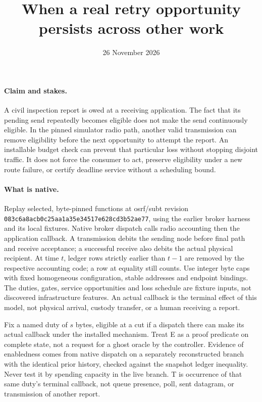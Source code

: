\documentclass{article}
\title{When a real retry opportunity persists across other work}
\date{26 November 2026}
\begin{document}
\maketitle
\paragraph{Claim and stakes.}
A civil inspection report is owed at a receiving application. The
fact that its pending send repeatedly becomes eligible does not make
the send continuously eligible. In the pinned simulator radio path,
another valid transmission can remove eligibility before the next
opportunity to attempt the report. An installable budget check can
prevent that particular loss without stopping disjoint traffic. It
does not force the consumer to act, preserve eligibility under a new
route failure, or certify deadline service without a scheduling bound.

\paragraph{What is native.}
Replay selected, byte-pinned functions at osrf/subt revision
\texttt{083c6a8acb0c25aa1a35e34517e628cd3b52ae77}, using the earlier
broker harness and its local fixtures. Native broker dispatch calls
radio accounting then the application callback. A transmission debits
the sending node before final path and receive acceptance; a successful
receive also debits the actual physical recipient. At time \(t\), ledger
rows strictly earlier than \(t-1\) are removed by the respective
accounting code; a row at equality still counts. Use integer byte
caps with fixed homogeneous configuration, stable addresses and
endpoint bindings. The duties, gates, service opportunities and
loss schedule are fixture inputs, not discovered infrastructure
features. An actual callback is the terminal effect of this model,
not physical arrival, custody transfer, or a human receiving a report.

Fix a named duty of \(s\) bytes, eligible at a cut if a dispatch there
can make its actual callback under the installed mechanism. Treat E
as a proof predicate on complete state, not a request for a ghost
oracle by the controller. Evidence of enabledness comes from native
dispatch on a separately reconstructed branch with the identical prior
history, checked against the snapshot ledger inequality. Never test
it by spending capacity in the live branch. T is occurrence of that
same duty's terminal callback, not queue presence, poll, sent datagram,
or transmission of another report.
\end{document}
